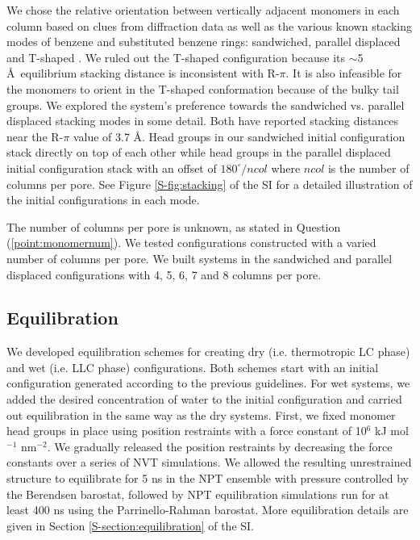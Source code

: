\documentclass[journal=jpcbfk,manuscript=article]{achemso}
\begin{document}
  We chose the relative orientation between vertically adjacent monomers in each column 
  based on clues from diffraction data as well as the various known stacking modes of 
  benzene and substituted benzene rings: sandwiched, parallel displaced and T-shaped
  \cite{sinnokrot_estimates_2002}. We ruled out the T-shaped configuration
  because its $\sim$5 \AA~equilibrium stacking distance \cite{sinnokrot_estimates_2002}
  is inconsistent with R-$\pi$. It is also infeasible for the monomers to orient in the 
  T-shaped conformation because of the bulky tail groups. We explored the system's 
  preference towards the sandwiched vs. parallel displaced stacking modes in some detail.
  Both have reported stacking distances near the R-$\pi$ value of 3.7 \AA. Head groups in
  our sandwiched initial configuration stack directly on top of each other while
  head groups in the parallel displaced initial configuration stack with an offset
  of $180^\circ/ncol$ where $ncol$ is the number of columns per pore. See Figure 
  \ref{S-fig:stacking} of the SI for a detailed illustration 
  of the initial configurations in each mode.

  The number of columns per pore is unknown, as stated in Question
  (\ref{point:monomernum}). We tested configurations constructed with a varied
  number of columns per pore. We built systems in the sandwiched and parallel
  displaced configurations with 4, 5, 6, 7 and 8 columns per pore.

  \subsection{Equilibration}\label{section:equilibration}
  
  We developed equilibration schemes for creating dry (i.e. thermotropic LC phase)
  and wet (i.e. LLC phase) configurations.
  Both schemes start with an initial configuration generated according to the
  previous guidelines. For wet systems, we added the desired concentration of
  water to the initial configuration and carried out equilibration in the same
  way as the dry systems. First, we fixed monomer head groups in place using
  position restraints with a force constant of 10$^6$ kJ mol$^{-1}$ nm$^{-2}$. We
  gradually released the position restraints by decreasing the force constants
  over a series of NVT simulations. We allowed the resulting unrestrained
  structure to equilibrate for 5 ns in the NPT ensemble with pressure controlled
  by the Berendsen barostat, followed by NPT equilibration simulations run for at
  least 400 ns using the Parrinello-Rahman barostat. More equilibration details
  are given in Section \ref{S-section:equilibration} of the SI.
\end{document}

